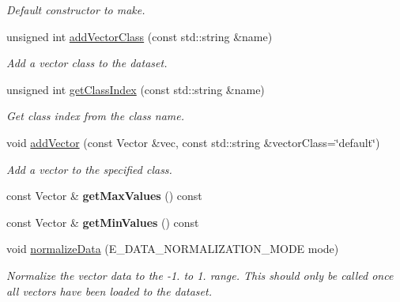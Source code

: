 \begin{DoxyCompactItemize}
\begin{DoxyCompactList}\small\item\em Default constructor to make. \end{DoxyCompactList}\item 
unsigned int \hyperlink{class_lots_of_lines_1_1_data_set_aff429ddd61367950bd1289fbcd095de2}{add\+Vector\+Class} (const std\+::string \&name)
\begin{DoxyCompactList}\small\item\em Add a vector class to the dataset. \end{DoxyCompactList}\item 
unsigned int \hyperlink{class_lots_of_lines_1_1_data_set_a574346ae47374acdf9a177dca226365b}{get\+Class\+Index} (const std\+::string \&name)\hypertarget{class_lots_of_lines_1_1_data_set_a574346ae47374acdf9a177dca226365b}{}\label{class_lots_of_lines_1_1_data_set_a574346ae47374acdf9a177dca226365b}

\begin{DoxyCompactList}\small\item\em Get class index from the class name. \end{DoxyCompactList}\item 
void \hyperlink{class_lots_of_lines_1_1_data_set_a4f12b125c969da469677f8a5ec6be10d}{add\+Vector} (const Vector \&vec, const std\+::string \&vector\+Class=\char`\"{}default\char`\"{})
\begin{DoxyCompactList}\small\item\em Add a vector to the specified class. \end{DoxyCompactList}\item 
const Vector \& {\bfseries get\+Max\+Values} () const \hypertarget{class_lots_of_lines_1_1_data_set_a7c495cd8a0d584ffc352b4fbd84c6e4f}{}\label{class_lots_of_lines_1_1_data_set_a7c495cd8a0d584ffc352b4fbd84c6e4f}

\item 
const Vector \& {\bfseries get\+Min\+Values} () const \hypertarget{class_lots_of_lines_1_1_data_set_afa668a139d080386883302ee8ef03f5a}{}\label{class_lots_of_lines_1_1_data_set_afa668a139d080386883302ee8ef03f5a}

\item 
void \hyperlink{class_lots_of_lines_1_1_data_set_a4a6256527dafe3081619a48902c299bb}{normalize\+Data} (E\+\_\+\+D\+A\+T\+A\+\_\+\+N\+O\+R\+M\+A\+L\+I\+Z\+A\+T\+I\+O\+N\+\_\+\+M\+O\+DE mode)\hypertarget{class_lots_of_lines_1_1_data_set_a4a6256527dafe3081619a48902c299bb}{}\label{class_lots_of_lines_1_1_data_set_a4a6256527dafe3081619a48902c299bb}

\begin{DoxyCompactList}\small\item\em Normalize the vector data to the -\/1. to 1. range. This should only be called once all vectors have been loaded to the dataset. \end{DoxyCompactList}\end{DoxyCompactItemize}


